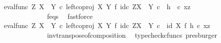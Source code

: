 \begin{isabellebody}
\ {\isachardoublequoteopen}{\isachardot}{\kern0pt}{\isachardot}{\kern0pt}{\isachardot}{\kern0pt}\ {\isacharequal}{\kern0pt}\ {\isacharparenleft}{\kern0pt}{\isacharparenleft}{\kern0pt}eval{\isacharunderscore}{\kern0pt}func\ Z\ {\isacharparenleft}{\kern0pt}X\ {\isasymCoprod}\ Y{\isacharparenright}{\kern0pt}\ {\isasymcirc}\isactrlsub c\ left{\isacharunderscore}{\kern0pt}coproj\ X\ Y\ {\isasymtimes}\isactrlsub f\ id\isactrlsub c\ {\isacharparenleft}{\kern0pt}Z\isactrlbsup {\isacharparenleft}{\kern0pt}X\ {\isasymCoprod}\ Y{\isacharparenright}{\kern0pt}\isactrlesup {\isacharparenright}{\kern0pt}{\isacharparenright}{\kern0pt}\isactrlsup {\isasymsharp}\ {\isasymcirc}\isactrlsub c\ \ h{\isacharparenright}{\kern0pt}\isactrlsup {\isasymflat}\ \ {\isasymcirc}\isactrlsub c\ {\isasymlangle}x{\isacharcomma}{\kern0pt}z{\isasymrangle}{\isachardoublequoteclose}\isanewline
\ \ \ \ \ \ \ \ \ \ \ \ \ \ \isamarkupfalse%
\ f{\isacharunderscore}{\kern0pt}eqs\ \isamarkupfalse%
\ fastforce\isanewline
\ \ \ \ \ \ \ \ \ \ \ \ \isamarkupfalse%
\ \isamarkupfalse%
\ {\isachardoublequoteopen}{\isachardot}{\kern0pt}{\isachardot}{\kern0pt}{\isachardot}{\kern0pt}\ {\isacharequal}{\kern0pt}\ {\isacharparenleft}{\kern0pt}{\isacharparenleft}{\kern0pt}{\isacharparenleft}{\kern0pt}eval{\isacharunderscore}{\kern0pt}func\ Z\ {\isacharparenleft}{\kern0pt}X\ {\isasymCoprod}\ Y{\isacharparenright}{\kern0pt}\ {\isasymcirc}\isactrlsub c\ left{\isacharunderscore}{\kern0pt}coproj\ X\ Y\ {\isasymtimes}\isactrlsub f\ id\isactrlsub c\ {\isacharparenleft}{\kern0pt}Z\isactrlbsup {\isacharparenleft}{\kern0pt}X\ {\isasymCoprod}\ Y{\isacharparenright}{\kern0pt}\isactrlesup {\isacharparenright}{\kern0pt}{\isacharparenright}{\kern0pt}\isactrlsup {\isasymsharp}\isactrlsup {\isasymflat}{\isacharparenright}{\kern0pt}\ {\isasymcirc}\isactrlsub c\ \ {\isacharparenleft}{\kern0pt}id\ X\ {\isasymtimes}\isactrlsub f\ h{\isacharparenright}{\kern0pt}{\isacharparenright}{\kern0pt}\ {\isasymcirc}\isactrlsub c\ {\isasymlangle}x{\isacharcomma}{\kern0pt}z{\isasymrangle}{\isachardoublequoteclose}\isanewline
\ \ \ \ \ \ \ \ \ \ \ \ \ \ \isamarkupfalse%
\ inv{\isacharunderscore}{\kern0pt}transpose{\isacharunderscore}{\kern0pt}of{\isacharunderscore}{\kern0pt}composition\ \isamarkupfalse%
\ {\isacharparenleft}{\kern0pt}typecheck{\isacharunderscore}{\kern0pt}cfuncs{\isacharcomma}{\kern0pt}\ presburger{\isacharparenright}{\kern0pt}\isanewline
\ \ \ \ \ \ \ \ \ \ \ \ \isamarkupfalse%
\ \isamarkupfalse%

\end{isabellebody}

